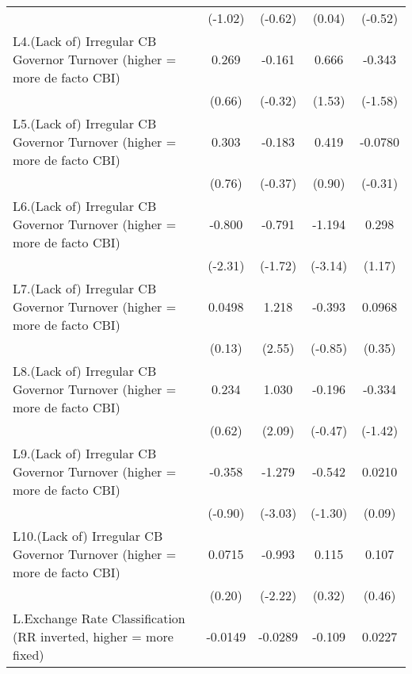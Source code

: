 {\begin{longtable}{l*{4}{c}}
                &  (-1.02)         &  (-0.62)         &   (0.04)         &  (-0.52)         \\
[1em]
L4.(Lack of) Irregular CB Governor Turnover (higher = more de facto CBI)&    0.269         &   -0.161         &    0.666         &   -0.343         \\
                &   (0.66)         &  (-0.32)         &   (1.53)         &  (-1.58)         \\
[1em]
L5.(Lack of) Irregular CB Governor Turnover (higher = more de facto CBI)&    0.303         &   -0.183         &    0.419         &  -0.0780         \\
                &   (0.76)         &  (-0.37)         &   (0.90)         &  (-0.31)         \\
[1em]
L6.(Lack of) Irregular CB Governor Turnover (higher = more de facto CBI)&   -0.800\sym{*}  &   -0.791         &   -1.194\sym{**} &    0.298         \\
                &  (-2.31)         &  (-1.72)         &  (-3.14)         &   (1.17)         \\
[1em]
L7.(Lack of) Irregular CB Governor Turnover (higher = more de facto CBI)&   0.0498         &    1.218\sym{*}  &   -0.393         &   0.0968         \\
                &   (0.13)         &   (2.55)         &  (-0.85)         &   (0.35)         \\
[1em]
L8.(Lack of) Irregular CB Governor Turnover (higher = more de facto CBI)&    0.234         &    1.030\sym{*}  &   -0.196         &   -0.334         \\
                &   (0.62)         &   (2.09)         &  (-0.47)         &  (-1.42)         \\
[1em]
L9.(Lack of) Irregular CB Governor Turnover (higher = more de facto CBI)&   -0.358         &   -1.279\sym{**} &   -0.542         &   0.0210         \\
                &  (-0.90)         &  (-3.03)         &  (-1.30)         &   (0.09)         \\
[1em]
L10.(Lack of) Irregular CB Governor Turnover (higher = more de facto CBI)&   0.0715         &   -0.993\sym{*}  &    0.115         &    0.107         \\
                &   (0.20)         &  (-2.22)         &   (0.32)         &   (0.46)         \\
[1em]
L.Exchange Rate Classification (RR inverted, higher = more fixed)&  -0.0149         &  -0.0289         &   -0.109         &   0.0227         \\

\end{longtable}}
